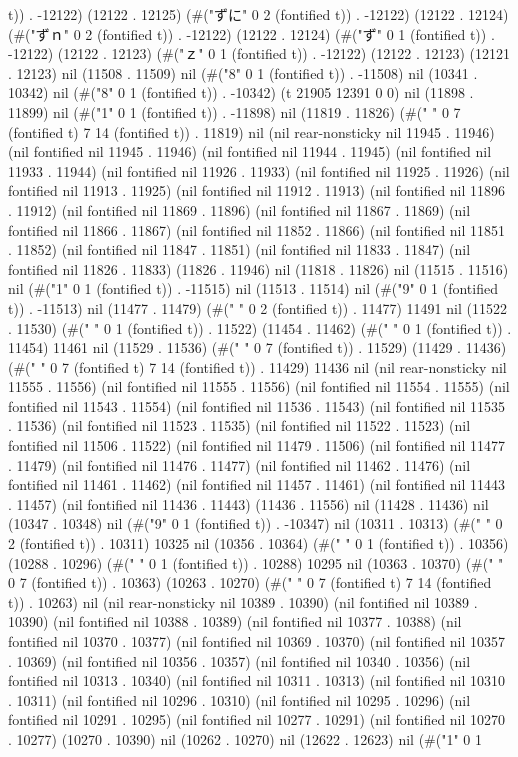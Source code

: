 t)) . -12122) (12122 . 12125) (#("ずに" 0 2 (fontified t)) . -12122) (12122 . 12124) (#("ずｎ" 0 2 (fontified t)) . -12122) (12122 . 12124) (#("ず" 0 1 (fontified t)) . -12122) (12122 . 12123) (#("ｚ" 0 1 (fontified t)) . -12122) (12122 . 12123) (12121 . 12123) nil (11508 . 11509) nil (#("8" 0 1 (fontified t)) . -11508) nil (10341 . 10342) nil (#("8" 0 1 (fontified t)) . -10342) (t 21905 12391 0 0) nil (11898 . 11899) nil (#("1" 0 1 (fontified t)) . -11898) nil (11819 . 11826) (#("              " 0 7 (fontified t) 7 14 (fontified t)) . 11819) nil (nil rear-nonsticky nil 11945 . 11946) (nil fontified nil 11945 . 11946) (nil fontified nil 11944 . 11945) (nil fontified nil 11933 . 11944) (nil fontified nil 11926 . 11933) (nil fontified nil 11925 . 11926) (nil fontified nil 11913 . 11925) (nil fontified nil 11912 . 11913) (nil fontified nil 11896 . 11912) (nil fontified nil 11869 . 11896) (nil fontified nil 11867 . 11869) (nil fontified nil 11866 . 11867) (nil fontified nil 11852 . 11866) (nil fontified nil 11851 . 11852) (nil fontified nil 11847 . 11851) (nil fontified nil 11833 . 11847) (nil fontified nil 11826 . 11833) (11826 . 11946) nil (11818 . 11826) nil (11515 . 11516) nil (#("1" 0 1 (fontified t)) . -11515) nil (11513 . 11514) nil (#("9" 0 1 (fontified t)) . -11513) nil (11477 . 11479) (#("	 " 0 2 (fontified t)) . 11477) 11491 nil (11522 . 11530) (#("	" 0 1 (fontified t)) . 11522) (11454 . 11462) (#("	" 0 1 (fontified t)) . 11454) 11461 nil (11529 . 11536) (#("       " 0 7 (fontified t)) . 11529) (11429 . 11436) (#("	             " 0 7 (fontified t) 7 14 (fontified t)) . 11429) 11436 nil (nil rear-nonsticky nil 11555 . 11556) (nil fontified nil 11555 . 11556) (nil fontified nil 11554 . 11555) (nil fontified nil 11543 . 11554) (nil fontified nil 11536 . 11543) (nil fontified nil 11535 . 11536) (nil fontified nil 11523 . 11535) (nil fontified nil 11522 . 11523) (nil fontified nil 11506 . 11522) (nil fontified nil 11479 . 11506) (nil fontified nil 11477 . 11479) (nil fontified nil 11476 . 11477) (nil fontified nil 11462 . 11476) (nil fontified nil 11461 . 11462) (nil fontified nil 11457 . 11461) (nil fontified nil 11443 . 11457) (nil fontified nil 11436 . 11443) (11436 . 11556) nil (11428 . 11436) nil (10347 . 10348) nil (#("9" 0 1 (fontified t)) . -10347) nil (10311 . 10313) (#("	 " 0 2 (fontified t)) . 10311) 10325 nil (10356 . 10364) (#("	" 0 1 (fontified t)) . 10356) (10288 . 10296) (#("	" 0 1 (fontified t)) . 10288) 10295 nil (10363 . 10370) (#("       " 0 7 (fontified t)) . 10363) (10263 . 10270) (#("	             " 0 7 (fontified t) 7 14 (fontified t)) . 10263) nil (nil rear-nonsticky nil 10389 . 10390) (nil fontified nil 10389 . 10390) (nil fontified nil 10388 . 10389) (nil fontified nil 10377 . 10388) (nil fontified nil 10370 . 10377) (nil fontified nil 10369 . 10370) (nil fontified nil 10357 . 10369) (nil fontified nil 10356 . 10357) (nil fontified nil 10340 . 10356) (nil fontified nil 10313 . 10340) (nil fontified nil 10311 . 10313) (nil fontified nil 10310 . 10311) (nil fontified nil 10296 . 10310) (nil fontified nil 10295 . 10296) (nil fontified nil 10291 . 10295) (nil fontified nil 10277 . 10291) (nil fontified nil 10270 . 10277) (10270 . 10390) nil (10262 . 10270) nil (12622 . 12623) nil (#("1" 0 1 